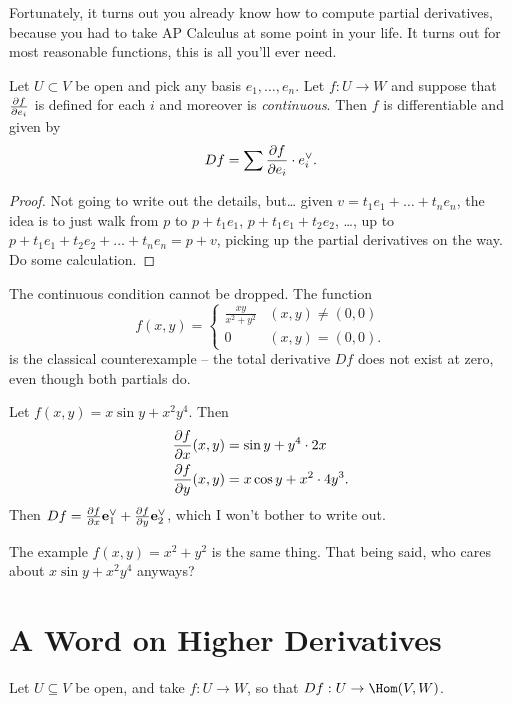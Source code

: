 Fortunately, it turns out you already know how to compute partial derivatives,
because you had to take AP Calculus at some point in your life.
It turns out for most reasonable functions, this is all you'll ever need.
\begin{theorem}
	Let $U \subset V$ be open and pick any basis $e_1, \dots, e_n$.
	Let $f : U \to W$ and suppose that $\frac{\partial f}{\partial e_i}$ is defined
	for each $i$ and moreover is \emph{continuous}.
	Then $f$ is differentiable and given by
	\[ Df = \sum \frac{\partial f}{\partial e_i} \cdot e_i^\vee. \]
\end{theorem}
\begin{proof}
	Not going to write out the details, but\dots
	given $v = t_1e_1 + \dots + t_ne_n$,
	the idea is to just walk from $p$ to $p+t_1e_1$, $p+t_1e_1+t_2e_2$, \dots,
	up to $p+t_1e_1+t_2e_2+\dots+t_ne_n = p+v$,
	picking up the partial derivatives on the way.
	Do some calculation.
\end{proof}

\begin{remark}
	The continuous condition cannot be dropped. The function
	\[
			f(x,y)
		=
		\begin{cases}
			\frac{xy}{x^2+y^2} & (x,y) \neq (0,0) \\
			0 & (x,y) = (0,0).
		\end{cases}
	\]
	is the classical counterexample -- the total derivative $Df$ does not exist at zero,
	even though both partials do.
\end{remark}

\begin{example}
	Let $f(x,y) = x \sin y + x^2y^4$. Then
	\begin{align*}
		\frac{\partial f}{\partial x} (x,y) &= \sin y + y^4 \cdot 2x \\
		\frac{\partial f}{\partial y} (x,y) &= x \cos y + x^2 \cdot 4y^3.
	\end{align*}
	Then $Df = \frac{\partial f}{\partial x} \mathbf e_1^\vee + \frac{\partial f}{\partial y} \mathbf e_2^\vee$,
	which I won't bother to write out.
\end{example}

The example $f(x,y) = x^2+y^2$ is the same thing.
That being said, who cares about $x \sin y + x^2y^4$ anyways?

\section{A Word on Higher Derivatives}
Let $U \subseteq V$ be open, and take $f : U \to W$, so that $Df : U \to \Hom(V,W)$.

